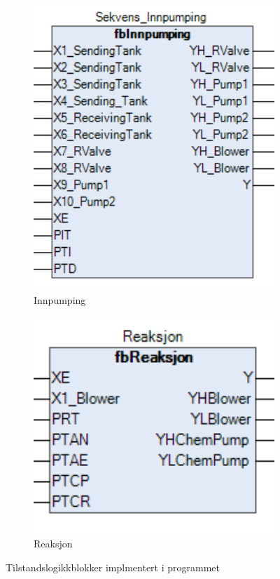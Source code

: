 \begin{figure}[htbp]
    \centering
    \begin{subfigure}[b]{0.3\textwidth}
        \centering
        \includegraphics[width=1\textwidth]{Bilder/fbInnpumping.png}
        \caption{Innpumping}\label{fig:fbInnpumping}
    \end{subfigure}
    \hfill
    \begin{subfigure}[b]{0.3\textwidth}
        \centering
        \includegraphics[width=1\textwidth]{Bilder/fbReaksjon.png}
        \caption{Reaksjon}\label{fig:fbReaksjon}
    \end{subfigure}
    \caption{Tilstandslogikkblokker implmentert i programmet}\label{fig:ReaksjonsFasen}
\end{figure}



